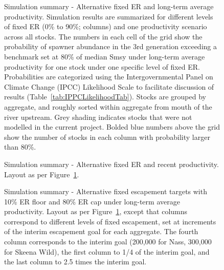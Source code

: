 \documentclass[french,11pt]{book}
\begin{document}
\clearpage


\begin{figure}[htb]

{\centering {} 

}

\caption{Simulation summary - Alternative fixed ER and long-term average productivity. Simulation results are summarized for different levels of fixed ER (0\% to 90\%; columns) and one productivity scenario across all stocks. The numbers in each cell of the grid show the probability of spawner abundance in the 3rd generation exceeding a benchmark set at 80\% of median Smsy under long-term average productivity for one stock under one specific level of fixed ER. Probabilities are categorized using the Intergovernmental Panel on Climate Change (IPCC) Likelihood Scale to facilitate discussion of results (Table~\ref{tab:IPPCLikelihoodTab}). Stocks are grouped by aggregate, and roughly sorted within aggregate from mouth of the river upstream. Grey shading indicates stocks that were not modelled in the current project. Bolded blue numbers above the grid show the number of stocks in each column with probability larger than 80\%.}\label{fig:HeatmapAggFixedERLtAvg}
\end{figure}
\clearpage


\begin{figure}[htb]

{\centering {} 

}

\caption{Simulation summary - Alternative fixed ER and recent productivity. Layout as per Figure~\ref{fig:HeatmapAggFixedERLtAvg}.}\label{fig:HeatmapAggFixedERRecent}
\end{figure}
\clearpage


\begin{figure}[htb]

{\centering {} 

}

\caption{Simulation summary - Alternative fixed escapement targets with 10\% ER floor and 80\% ER cap under long-term average productivity. Layout as per Figure~\ref{fig:HeatmapAggFixedERLtAvg}, except that columns correspond to different levels of fixed escapement, set at increments of the interim escapement goal for each aggregate. The fourth column corresponds to the interim goal (200,000 for Nass, 300,000 for Skeena Wild), the first column to 1/4 of the interim goal, and the last column to 2.5 times the interim goal.}\label{fig:HeatmapAggFixedEscLtAvg}
\end{figure}
\clearpage
\end{document}
